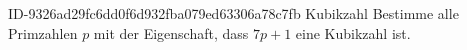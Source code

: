 \begin{exercise}
      {ID-9326ad29fc6dd0f6d932fba079ed63306a78c7fb}
      {Kubikzahl}
  \ifproblem\problem
    Bestimme alle Primzahlen $p$ mit der Eigenschaft, dass $7p+1$ eine
    Kubikzahl ist.
  \fi
\end{exercise}
